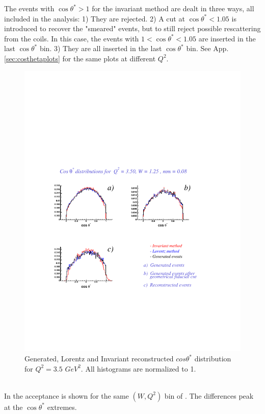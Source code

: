 The events with $\cos\theta^* > 1$
for the invariant method are dealt in three ways, all included in the analysis: 
1) They are rejected. 2) A cut at $\cos\theta^* < 1.05$ is introduced
to recover the "smeared" events, but to still reject possible rescattering from the coils. In this case, the events with
$1 < \cos\theta^* < 1.05$ are inserted in the last $\cos\theta^*$ bin. 3) They are all inserted in the last $\cos\theta^*$ bin. 
See App. \ref{sec:costhetaplots} for the same plots at different $Q^2$.
\begin{figure}[h]
 \begin{center}
  \includegraphics[width = 12cm, bb = 60 140 540 540]{systematics/img/ctheta_q23.50_W1.25_mm0.08}
  \caption{Generated, Lorentz and Invariant reconstructed $cos\theta^*$ distribution for $Q^2=3.5$ $GeV^2$.
           All histograms are normalized to 1.}
  \label{fig:cmctheta}
 \end{center}
\end{figure}  \\
In  the acceptance is shown for the same $(W,Q^2)$ bin of . The differences
peak at the $\cos\theta^*$ extremes.

